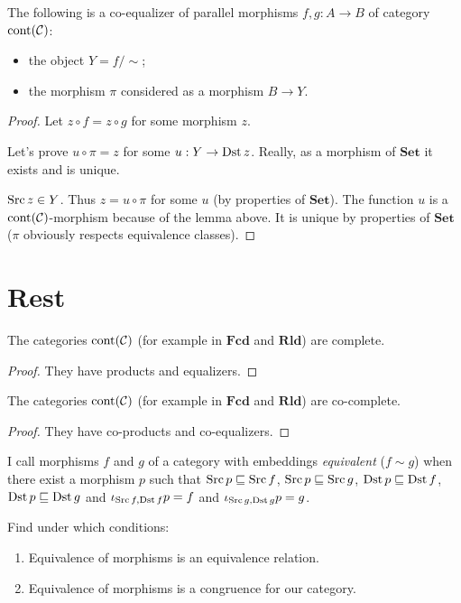 \begin{thm}
  The following is a co-equalizer of parallel morphisms $f, g : A \rightarrow
  B$ of category $\operatorname{cont} (\mathcal{C})$:
  \begin{itemize}
    \item the object $Y = f / \sim$;
    
    \item the morphism $\pi$ considered as a morphism $B \rightarrow Y$.
  \end{itemize}
\end{thm}

\begin{proof}
  Let $z \circ f = z \circ g$ for some morphism $z$.
  
  Let's prove $u \circ \pi = z$ for some $u : Y \rightarrow \operatorname{Dst} z$.
  Really, as a morphism of $\mathbf{Set}$ it exists and is unique.
  
  $\operatorname{Src} z \in Y$. Thus $z = u \circ \pi$ for some $u$ (by properties of
  $\mathbf{Set}$). The function $u$ is a $\operatorname{cont}
  (\mathcal{C})$-morphism because of the lemma above. It is unique by
  properties of $\mathbf{Set}$ ($\pi$ obviously respects equivalence
  classes).
\end{proof}

\section{Rest}

\begin{thm}
  The categories $\operatorname{cont} (\mathcal{C})$ (for example in
  $\mathbf{Fcd}$ and $\mathbf{Rld}$) are complete.
\end{thm}

\begin{proof}
  They have products and equalizers.
\end{proof}

\begin{thm}
  The categories $\operatorname{cont} (\mathcal{C})$ (for example in
  $\mathbf{Fcd}$ and $\mathbf{Rld}$) are co-complete.
\end{thm}

\begin{proof}
  They have co-products and co-equalizers.
\end{proof}

\begin{defn}
  I call morphisms $f$ and $g$ of a category with embeddings
  \emph{equivalent} ($f \sim g$) when there exist a morphism $p$ such that
  $\operatorname{Src} p \sqsubseteq \operatorname{Src} f$, $\operatorname{Src} p \sqsubseteq
  \operatorname{Src} g$, $\operatorname{Dst} p \sqsubseteq \operatorname{Dst} f$, $\operatorname{Dst} p
  \sqsubseteq \operatorname{Dst} g$ and $\iota_{\operatorname{Src} f, \operatorname{Dst} f} p = f$ and
  $\iota_{\operatorname{Src} g, \operatorname{Dst} g} p = g$.
\end{defn}

\begin{problem}
  Find under which conditions:
  \begin{enumerate}
    \item Equivalence of morphisms is an equivalence relation.
    
    \item Equivalence of morphisms is a congruence for our category.
  \end{enumerate}
\end{problem}